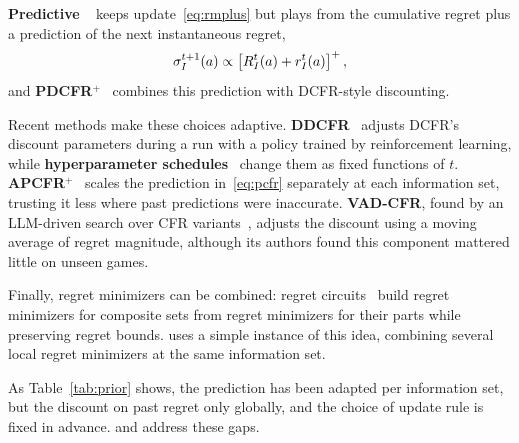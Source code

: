 \textbf{Predictive \cfrp{}}~\cite{farina2021faster} keeps update~\eqref{eq:rmplus} but plays
from the cumulative regret plus a prediction of the next instantaneous regret,
\begin{equation}
  \sigma^{t+1}_I(a) \propto \left[R^t_I(a) + r^t_I(a)\right]^{+},
  \label{eq:pcfr}
\end{equation}
and \textbf{PDCFR$^+$}~\cite{xu2024minimizing} combines this prediction with DCFR-style
discounting.

Recent methods make these choices adaptive. \textbf{DDCFR}~\cite{xu2024dynamic} adjusts DCFR's
discount parameters during a run with a policy trained by reinforcement learning, while
\textbf{hyperparameter schedules}~\cite{zhang2026faster} change them as fixed functions of $t$.
\textbf{APCFR$^+$}~\cite{meng2025faster} scales the prediction in~\eqref{eq:pcfr} separately at
each information set, trusting it less where past predictions were inaccurate. \textbf{VAD-CFR},
found by an LLM-driven search over CFR variants~\cite{li2026discovering}, adjusts the discount
using a moving average of regret magnitude, although its authors found this component mattered
little on unseen games.

Finally, regret minimizers can be combined: regret circuits~\cite{farina2019regret} build
regret minimizers for composite sets from regret minimizers for their parts while preserving
regret bounds. \mix{} uses a simple instance of this idea, combining several local regret
minimizers at the same information set.

As Table~\ref{tab:prior} shows, the prediction has been adapted per information set, but the
discount on past regret only globally, and the choice of update rule is fixed in advance.
\ours{} and \mix{} address these gaps.

